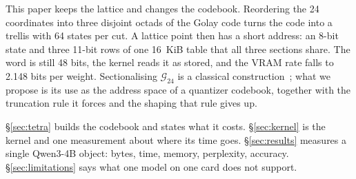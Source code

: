 This paper keeps the lattice and changes the codebook. Reordering the 24
coordinates into three disjoint octads of the Golay code turns the code into a
trellis with 64 states per cut. A lattice point then has a short address: an
8-bit state and three 11-bit rows of one 16~KiB table that all three sections
share. The word is still 48 bits, the kernel reads it as stored, and the VRAM
rate falls to 2.148 bits per weight. Sectionalising $\mathcal{G}_{24}$ is a
classical construction~\citep{forney1988,vardy1991}; what we propose is its use
as the address space of a quantizer codebook, together with the truncation rule
it forces and the shaping that rule gives up.

\S\ref{sec:tetra} builds the codebook and states what it costs.
\S\ref{sec:kernel} is the kernel and one measurement about where its time
goes. \S\ref{sec:results} measures a single Qwen3-4B object: bytes, time,
memory, perplexity, accuracy. \S\ref{sec:limitations} says what one model on
one card does not support.
